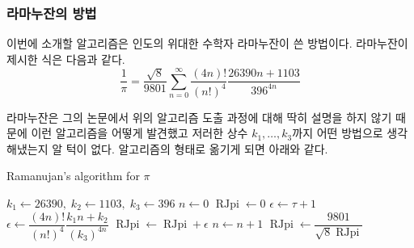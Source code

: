 \documentclass[10pt]{article}
\newcommand{\opn}{\operatorname}
\begin{document}
\subsubsection{라마누잔의 방법}
이번에 소개할 알고리즘은 인도의 위대한 수학자 라마누잔이 쓴 방법이다. 라마누잔이 제시한 식은 다음과 같다.
$$
  \frac{1}{\pi} = \frac{\sqrt{8}}{9801}\sum_{n=0}^{\infty}\frac{\left(4n\right)!}{\left(n!\right)^{4}}\frac{26390n+1103}{396^{4n}}
$$

라마누잔은 그의 논문\cite{ramanujan}에서 위의 알고리즘 도출 과정에 대해 딱히 설명을 하지 않기 때문에 이런 알고리즘을 어떻게 발견했고 저러한 상수 $k_{1},\ldots , k_{3}$까지 어떤 방법으로 생각해냈는지 알 턱이 없다. 알고리즘의 형태로 옮기게 되면 아래와 같다.
\begin{algorithm}
  \caption{Ramanujan's algorithm for $\pi$}
  \begin{algorithmic}[1]
  \label{RJpi}
    \State $k_{1} \gets 26390, \; k_{2} \gets 1103, \; k_{3} \gets 396$
    \State $n \gets 0$
    \State $ \opn{RJpi} \gets 0$
    \State $\epsilon \gets \tau + 1$
    \While{$\epsilon > \tau$}
      \State $\epsilon \gets \dfrac{\left(4n\right)!}{\left(n!\right)^{4}}\dfrac{k_{1}n+k_{2}}{\left(k_{3}\right)^{4n}}$
      \State $\opn{RJpi} \gets \opn{RJpi} + \epsilon$
      \State $n \gets n + 1$
    \EndWhile
    \State $\opn{RJpi} \gets \dfrac{9801}{\sqrt{8}\opn{RJpi}}$
  \EndProcedure
  \end{algorithmic}
\end{algorithm}
\end{document}
